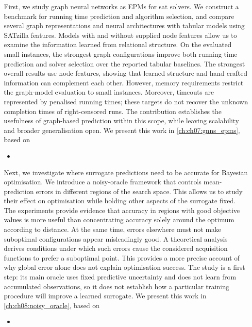 First, we study graph neural networks as EPMs for \gls{sat} solvers. We construct a benchmark for running time prediction and algorithm selection, and compare several graph representations and neural architectures with tabular models using SATzilla features. Models with and without supplied node features allow us to examine the information learned from relational structure. On the evaluated small instances, the strongest graph configurations improve both running time prediction and solver selection over the reported tabular baselines. The strongest overall results use node features, showing that learned structure and hand-crafted information can complement each other. However, memory requirements restrict the graph-model evaluation to small instances. Moreover, timeouts are represented by penalised running times; these targets do not recover the unknown completion times of right-censored runs. The contribution establishes the usefulness of graph-based prediction within this scope, while leaving scalability and broader generalisation open. We present this work in \cref{ch:ch07:gnns_epms}, based on
\begin{itemize}
    \item {}
\end{itemize}

Next, we investigate where surrogate predictions need to be accurate for Bayesian optimisation. We introduce a noisy-oracle framework that controls mean-prediction errors in different regions of the search space. This allows us to study their effect on optimisation while holding other aspects of the surrogate fixed. The experiments provide evidence that accuracy in regions with good objective values is more useful than concentrating accuracy solely around the optimum according to distance. At the same time, errors elsewhere must not make suboptimal configurations appear misleadingly good. A theoretical analysis derives conditions under which such errors cause the considered acquisition functions to prefer a suboptimal point. This provides a more precise account of why global error alone does not explain optimisation success. The study is a first step: its main oracle uses fixed predictive uncertainty and does not learn from accumulated observations, so it does not establish how a particular training procedure will improve a learned surrogate. We present this work in \cref{ch:ch08:noisy_oracle}, based on
\begin{itemize}
    \item {}
\end{itemize}

